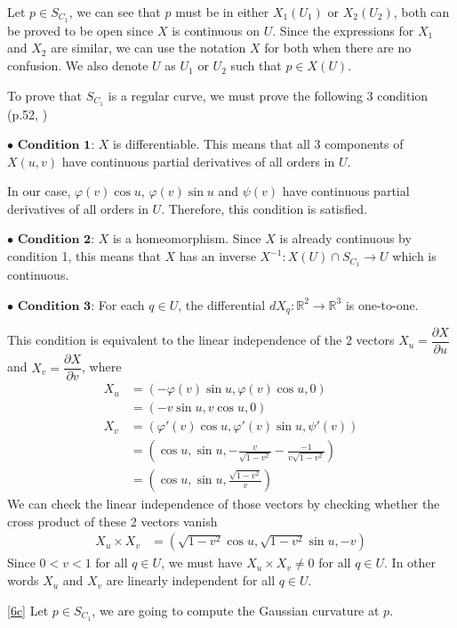 \documentclass[a4paper]{report}
\begin{document}
Let $p\in S_{C_1}$, we can see that $p$ must be in either $X_1(U_1)$ or $X_2(U_2)$, both can be proved to be open since $X$ is continuous on $U$. Since the expressions for $X_1$ and $X_2$ are similar, we can use the notation $X$ for both when there are no confusion. We also denote $U$ as $U_1$ or $U_2$ such that $p \in X(U)$.

To prove that $S_{C_1}$ is a regular curve, we must prove the following 3 condition (p.52, \cite{2})

$\bullet$ $\textbf{Condition 1:}$ $X$ is differentiable. This means that all 3 components of $X(u,v)$ have continuous  partial derivatives of all orders in $U$.

In our case, $\varphi(v) \cos u$, $\varphi(v) \sin u$ and $\psi(v)$ have continuous partial derivatives of all orders in $U$. Therefore, this condition is satisfied.

$\bullet$ $\textbf{Condition 2:}$ $X$ is a homeomorphism. Since $X$ is already continuous by condition 1, this means that $X$ has an inverse $X^{-1}: X(U) \cap S_{C_1} \to U$ which is continuous.

$\bullet$ $\textbf{Condition 3:}$ For each $q \in U$, the differential $dX_q: \mathbb{R}^2 \to \mathbb{R}^3$ is one-to-one.

This condition is equivalent to the linear independence of the 2 vectors $X_u=\dfrac{\partial X}{\partial u}$ and $X_v=\dfrac{\partial X}{\partial v}$, where
\begin{align}
	X_u &= \left(-\varphi(v)\sin u, \varphi(v) \cos u ,0  \right)\\
	&= \left(-v\sin u, v \cos u ,0  \right)\\
	X_v &= \left( \varphi'(v) \cos u, \varphi'(v) \sin u , \psi'(v) \right)\\
	&= \left( \cos u, \sin u , -\frac{v}{\sqrt{1-v^2}} - \frac{-1}{v\sqrt{1 - v^2}} \right)\\
	&= \left( \cos u, \sin u , \frac{\sqrt{1-v^2}}{v}\right)
\end{align}
We can check the linear independence of those vectors by checking whether the cross product of these 2 vectors vanish
\begin{align}
	X_u \times X_v &= \left(\sqrt{1-v^2} \cos u, \sqrt{1-v^2} \sin u,-v \right)
\end{align}
Since $0 < v <1$ for all $q \in U$, we must have $X_u \times X_v \neq 0$ for all $q \in U$. In other words $X_u$ and $X_v$ are linearly independent for all $q \in U$.


\newpage
\ref{6c} Let $p \in S_{C_1}$, we are going to compute the Gaussian curvature at $p$.
\end{document}
